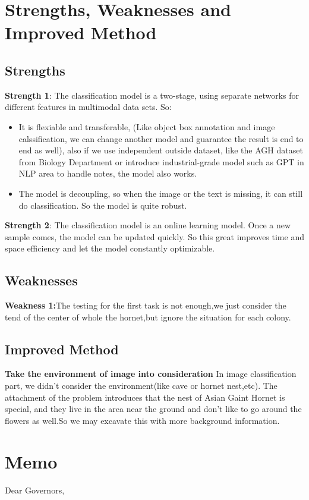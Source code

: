 \documentclass[12pt]{article}
\begin{document}
\section{Strengths, Weaknesses and Improved Method}
\subsection{Strengths}
\textbf{Strength 1}: The classification model is a two-stage, using separate networks for different features in multimodal data sets. So:
\begin{itemize}
	\item  It is flexiable and transferable, (Like object box annotation and image calssification, we can change another model and guarantee the result is end to end as well), also if we use independent outside dataset, like the AGH dataset from Biology Department or introduce industrial-grade model such as GPT in NLP area to handle notes, the model also works.
	\item  The model is decoupling, so when the image or the text is missing, it can still do classification. So the model is quite robust.
\end{itemize}

\textbf{Strength 2}: The classification model is an online learning model. Once a new sample comes, the model can be updated quickly. So this great improves time and space efficiency and let the model constantly optimizable.

\subsection{Weaknesses}
\textbf{Weakness 1:}The testing for the first task is not enough,we just consider the tend of the center of whole the hornet,but ignore the situation for each colony.

\subsection{Improved Method}
\textbf{Take the environment of image into consideration}
In image classification part, we didn't consider the environment(like cave or hornet nest,etc). The attachment of the problem introduces that the nest of Asian Gaint Hornet is special, and they live in the area near the ground and don't like to go around the flowers as well.So we may excavate this with more background information.

\clearpage
\section*{Memo}
	\begin{flushleft}
		Dear Governors,
	\end{flushleft}
	
\end{document}
